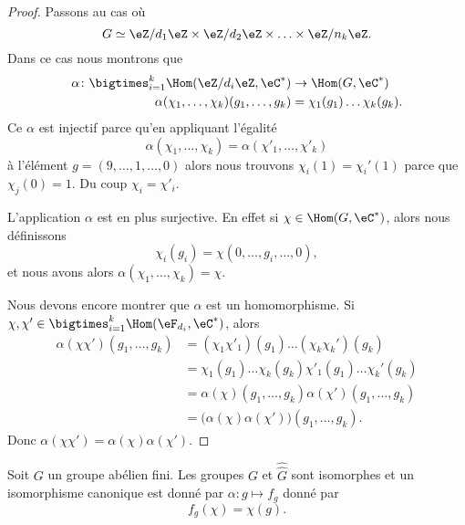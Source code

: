 \begin{proof}
    Passons au cas où
    \begin{equation}
        G\simeq \eZ/d_1\eZ\times \eZ/d_2\eZ\times \ldots\times \eZ/n_k\eZ.
    \end{equation}
    Dans ce cas nous montrons que
    \begin{equation}
        \begin{aligned}
            \alpha\colon \bigtimes_{i=1}^k\Hom(\eZ/d_i\eZ,\eC^*)&\to \Hom(G,\eC^*) \\
            \alpha(\chi_1,\ldots, \chi_k)(g_1,\ldots, g_k)&= \chi_1(g_1)\ldots\chi_k(g_k).
        \end{aligned}
    \end{equation}
    Ce \( \alpha\) est injectif parce qu'en appliquant l'égalité
    \begin{equation}
        \alpha(\chi_1,\ldots, \chi_k)=\alpha(\chi'_1,\ldots, \chi'_k)
    \end{equation}
    à l'élément \( g=(9,\ldots, 1,\ldots, 0)\) alors nous trouvons \( \chi_i(1)=\chi_i'(1)\) parce que \( \chi_j(0)=1\). Du coup \( \chi_i=\chi'_i\).

    L'application \( \alpha\) est en plus surjective. En effet si \( \chi\in\Hom(G,\eC^*)\), alors nous définissons
    \begin{equation}
        \chi_i(g_i)=\chi(0,\ldots, g_i,\ldots, 0),
    \end{equation}
    et nous avons alors \( \alpha(\chi_1,\ldots, \chi_k)=\chi\).

    Nous devons encore montrer que \( \alpha\) est un homomorphisme. Si \( \chi,\chi'\in\bigtimes_{i=1}^k\Hom(\eF_{d_i},\eC^*)\), alors
    \begin{subequations}
        \begin{align}
            \alpha(\chi\chi')(g_1,\ldots, g_k)&=(\chi_1\chi'_1)(g_1)\ldots (\chi_k\chi_k')(g_k)\\
            &=\chi_1(g_1)\ldots \chi_k(g_k)\chi'_1(g_1)\ldots \chi_k'(g_k)\\
            &=\alpha(\chi)(g_1,\ldots, g_k)\alpha(\chi')(g_1,\ldots, g_k)\\
            &=\big( \alpha(\chi)\alpha(\chi') \big)(g_1,\ldots, g_k).
        \end{align}
    \end{subequations}
    Donc \( \alpha(\chi\chi')=\alpha(\chi)\alpha(\chi')\).
\end{proof}

\begin{theorem}
    Soit \( G\) un groupe abélien fini. Les groupes \( G\) et \( \hat{\hat G}\) sont isomorphes et un isomorphisme canonique est donné par \( \alpha\colon g\mapsto f_g\) donné par
    \begin{equation}
        f_g(\chi)=\chi(g).
    \end{equation}
\end{theorem}

